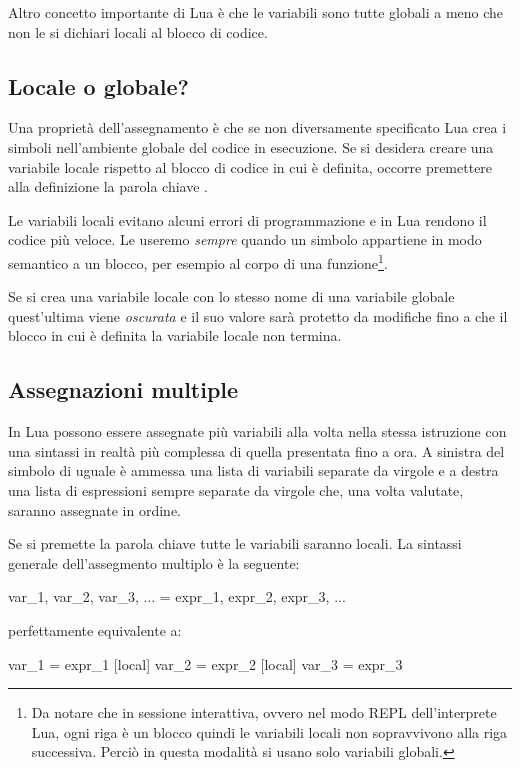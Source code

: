 Altro concetto importante di Lua è che le variabili sono tutte globali a meno
che non le si dichiari locali al blocco di codice.


\subsection{Locale o globale?}
\label{secFondLocaleGlobale}

Una proprietà dell'assegnamento è che se non diversamente specificato Lua
crea i simboli nell'ambiente globale del codice in esecuzione. Se si
desidera creare una variabile locale rispetto al blocco di codice in cui è
definita, occorre premettere alla definizione la parola chiave .

Le variabili locali evitano alcuni errori di programmazione e in Lua rendono il
codice più veloce. Le useremo \emph{sempre} quando un simbolo appartiene in modo
semantico a un blocco, per esempio al corpo di una funzione\footnote{Da notare
che in sessione interattiva, ovvero nel modo REPL dell'interprete Lua, ogni riga
è un blocco quindi le variabili locali non sopravvivono alla riga successiva.
Perciò in questa modalità si usano solo variabili globali.}.

Se si crea una variabile locale con lo stesso nome di una variabile globale
quest'ultima viene \emph{oscurata} e il suo valore sarà protetto da modifiche
fino a che il blocco in cui è definita la variabile locale non termina.


\subsection{Assegnazioni multiple}

In Lua possono essere assegnate più variabili alla volta nella stessa istruzione
con una sintassi in realtà più complessa di quella presentata fino a ora. A
sinistra del simbolo di uguale è ammessa una lista di variabili separate da
virgole e a destra una lista di espressioni sempre separate da virgole che, una
volta valutate, saranno assegnate in ordine.

Se si premette la parola chiave  tutte le variabili saranno locali.
La sintassi generale dell'assegmento multiplo è la seguente:
\begin{lines}
[local] var_1, var_2, var_3, ... = expr_1, expr_2, expr_3, ...
\end{lines}
perfettamente equivalente a:
\begin{lines}
[local] var_1 = expr_1
[local] var_2 = expr_2
[local] var_3 = expr_3
\end{lines}

